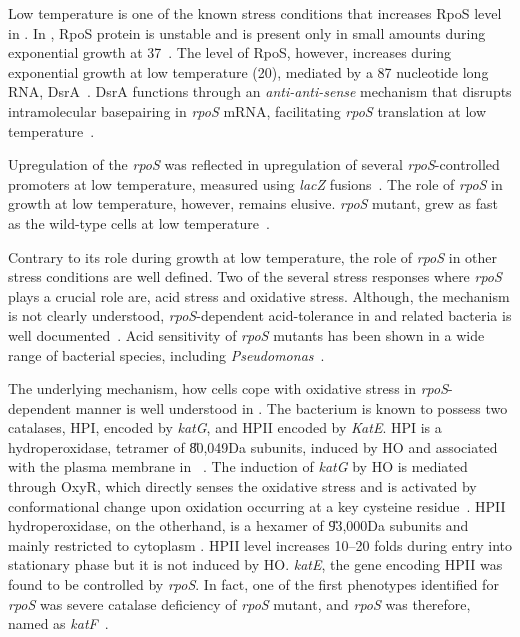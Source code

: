 Low temperature is one of the known stress conditions that
increases RpoS level in . In , RpoS protein is
unstable and is present only in small amounts during exponential
growth at 37\dg{}~\citep{Lange1994}. The level of RpoS, however,
increases during exponential growth at low temperature (20\dg{}),
mediated by a 87 nucleotide long RNA, DsrA~\citep{Sledjeski1996}.
DsrA functions through an \emph{anti-anti-sense} mechanism that
disrupts intramolecular basepairing in \emph{rpoS} mRNA,
facilitating \emph{rpoS} translation at low
temperature~\citep{Majdalani1998,Lease1998,Lease2000}.

Upregulation of the \emph{rpoS} was  reflected in upregulation of
several \emph{rpoS}-controlled promoters at low temperature,
measured using \emph{lacZ}
fusions~\citep{Sledjeski1996,Rajkumari2001}. The role of
\emph{rpoS} in growth at low temperature, however, remains
elusive. \emph{rpoS} mutant, grew as fast as the wild-type cells
at low temperature~\citep{Sledjeski1996}.

Contrary to its role during growth at low temperature, the role of
\emph{rpoS} in other stress conditions are well defined. Two of
the several stress responses where \emph{rpoS} plays a crucial
role are, acid stress and oxidative stress. Although, the
mechanism is not clearly understood, \emph{rpoS}-dependent
acid-tolerance in  and related bacteria is well
documented~\citep{Small1994,Cheville1996,Lee1995}. Acid
sensitivity of \emph{rpoS} mutants has been shown in a wide range
of bacterial species, including
\emph{Pseudomonas}~\citep{Jorgensen1999}.

The underlying mechanism, how cells cope with oxidative stress in
\emph{rpoS}-dependent manner is well understood in . The
bacterium is known to possess two catalases, HPI, encoded by
\emph{katG}, and HPII encoded by \emph{KatE}\@. HPI is a
hydroperoxidase, tetramer of \U{80,049}{Da} subunits, induced by
HO and associated with the plasma membrane in
~\citep{Schellhorn1995,Heimberger1988,Loewen1985}. The
induction of \emph{katG} by HO is mediated through
OxyR, which directly senses the oxidative stress and is activated
by conformational change upon oxidation occurring at a key
cysteine residue~\citep{Storz1990}. HPII hydroperoxidase, on the
otherhand, is a hexamer of \U{93,000}{Da} subunits and mainly
restricted to cytoplasm
\citep{Schellhorn1995,Heimberger1988,Loewen1985,Loewen1986,Loewen1984a}.
HPII level increases 10--20 folds during entry into stationary
phase but it is not induced by HO. \emph{katE}, the
gene encoding HPII was found to be controlled by \emph{rpoS}. In
fact, one of the first phenotypes identified for \emph{rpoS} was
severe catalase deficiency of \emph{rpoS} mutant, and \emph{rpoS}
was therefore, named as \emph{katF}~\citep{Loewen1984b}.

